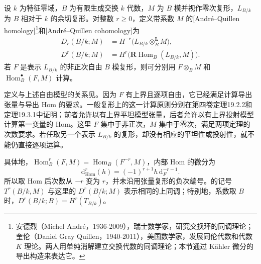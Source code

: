 \begin{definition}\label{b3:def:C-aq-with-coefficients}
	设 \(k\) 为特征零域，\(B\) 为有限生成交换 \(k\) 代数，\(M\) 为 \(B\) 模并视作零次复形，\(L_{B/k}\) 为 \(B\) 相对于 \(k\) 的余切复形。对整数 \(r\ge0\)，定义带系数 \(M\) 的[André--Quillen homology]\footnote{安德烈（Michel André，1936-2009），瑞士数学家，研究交换环的同调理论；奎伦（Daniel Gray Quillen，1940-2011），美国数学家，发展同伦代数和代数 \(K\) 理论。两人用单纯消解建立交换代数的同调理论；本节通过 Kähler 微分的导出构造来表达它。}和[André--Quillen cohomology]为
	\[
		\begin{aligned}
			D_r(B/k;M)&=H^{-r}\bigl(L_{B/k}\otimes_B^{\mathbf L}M\bigr),\\
			D^r(B/k;M)&=H^r\bigl(\mathbf R\operatorname{Hom}_B(L_{B/k},M)\bigr).
		\end{aligned}
	\]
	若 \(F\) 是表示 \(L_{B/k}\) 的非正次自由 \(B\) 模复形，则可分别用 \(F\otimes_BM\) 和 \(\operatorname{Hom}_B^\bullet(F,M)\) 计算。
\end{definition}

定义与上述自由模型的关系见\cite[5.7--5.8]{Iyengar2007AndreQuillen}。因为 \(F\) 有上界且逐项自由，它已经满足计算导出张量与导出 Hom 的要求。一般复形上的这一计算原则分别在第四卷定理19.2.2和定理19.3.1中证明；前者允许以有上界平坦模型张量，后者允许以有上界投射模型计算第一变量的 Hom。这里 \(F\) 集中于非正次，\(M\) 集中于零次，满足两项定理的次数要求。若任取另一个表示 \(L_{B/k}\) 的复形，却没有相应的平坦性或投射性，就不能仍直接逐项运算。

\ProseParagraphBreak
具体地，\(\operatorname{Hom}_B^r(F,M)=\operatorname{Hom}_B(F^{-r},M)\)，内部 Hom 的微分为
\[
	\mathrm{d}_{\operatorname{Hom}}^r(h)=(-1)^{r+1}h\,\mathrm{d}_F^{-r-1}.
\]
所以取 Hom 后次数从 \(-r\) 变为 \(r\)，并未沿用张量复形的负次编号。的记号 \(T^r(B/k,M)\) 与这里的 \(D^r(B/k;M)\) 表示相同的上同调；特别地，系数取 \(B\) 时，\(D^r(B/k;B)=H^r(T_{B/k})\)。

